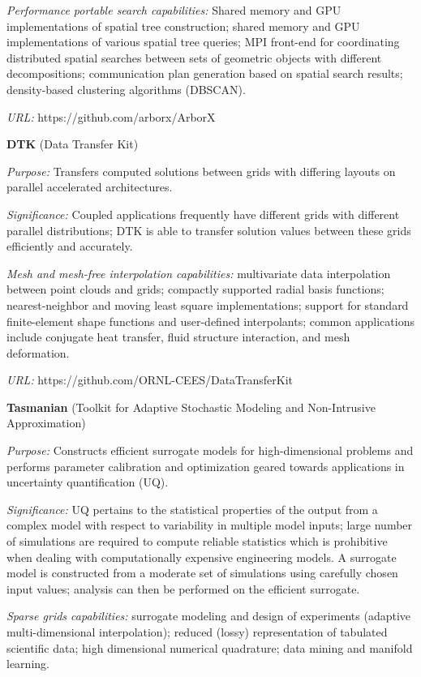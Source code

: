 {\it Performance portable search capabilities:} Shared memory and GPU
implementations of spatial tree construction; shared memory and GPU
implementations of various spatial tree queries; MPI front-end for
coordinating distributed spatial searches between sets of geometric objects
with different decompositions; communication plan generation based on spatial
search results; density-based clustering algorithms (DBSCAN).

{\it URL:} https://github.com/arborx/ArborX

{\bf DTK} (Data Transfer Kit)

{\it Purpose:} Transfers computed solutions between grids with differing
layouts on parallel accelerated architectures.

{\it Significance:} Coupled applications frequently have different grids with
different parallel distributions; DTK is able to transfer solution values
between these grids efficiently and accurately.

{\it Mesh and mesh-free interpolation capabilities:} multivariate data
interpolation between point clouds and grids; compactly supported radial basis
functions; nearest-neighbor and moving least square implementations; support
for standard finite-element shape functions and user-defined interpolants;
common applications include conjugate heat transfer, fluid structure
interaction, and mesh deformation.

{\it URL:} https://github.com/ORNL-CEES/DataTransferKit


{\bf Tasmanian} (Toolkit for Adaptive Stochastic Modeling and Non-Intrusive
Approximation)

{\it Purpose:} Constructs efficient surrogate models for high-dimensional
problems and performs parameter calibration and optimization geared towards
applications in uncertainty quantification (UQ).

{\it Significance:} UQ pertains to the statistical properties of the output
from a complex model with respect to variability in multiple model inputs;
large number of simulations are required to compute reliable statistics which
is prohibitive when dealing with computationally expensive engineering
models. A surrogate model is constructed from a moderate set of simulations
using carefully chosen input values; analysis can then be performed on the
efficient surrogate.

{\it Sparse grids capabilities:} surrogate modeling and design of experiments
(adaptive multi-dimensional interpolation); reduced (lossy) representation of
tabulated scientific data; high dimensional numerical quadrature; data mining
and manifold learning.

